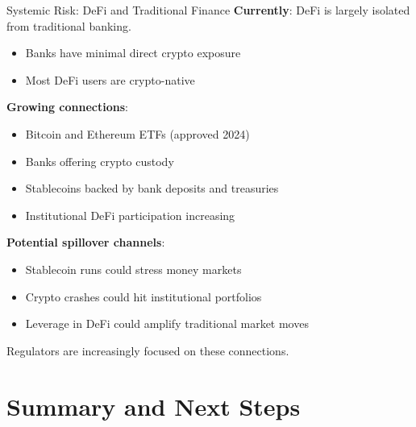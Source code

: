 \documentclass[10pt]{beamer}
\begin{document}
\begin{frame}{Systemic Risk: DeFi and Traditional Finance}
  \textbf{Currently}: DeFi is largely isolated from traditional banking.
  \begin{itemize}
    \item Banks have minimal direct crypto exposure
    \item Most DeFi users are crypto-native
  \end{itemize}
  
  \vspace{1em}
  \textbf{Growing connections}:
  \begin{itemize}
    \item Bitcoin and Ethereum ETFs (approved 2024)
    \item Banks offering crypto custody
    \item Stablecoins backed by bank deposits and treasuries
    \item Institutional DeFi participation increasing
  \end{itemize}
  
  \vspace{1em}
  \textbf{Potential spillover channels}:
  \begin{itemize}
    \item Stablecoin runs could stress money markets
    \item Crypto crashes could hit institutional portfolios
    \item Leverage in DeFi could amplify traditional market moves
  \end{itemize}
  
  \vspace{0.5em}
  Regulators are increasingly focused on these connections.
\end{frame}

\section{Summary and Next Steps}
\end{document}

